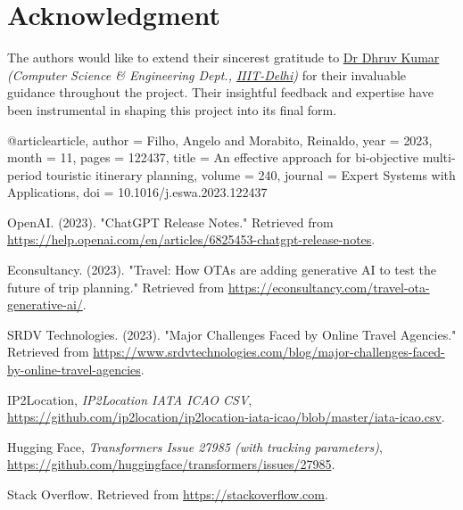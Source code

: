 \documentclass[conference]{IEEEtran}
\begin{document}
\section*{Acknowledgment}
    The authors would like to extend their sincerest gratitude to \href{https://www.iiitd.ac.in/dhruv}{Dr Dhruv Kumar} \textit{(Computer Science \& Engineering Dept., \href{https://www.iiitd.ac.in/}{IIIT-Delhi})} for their invaluable guidance throughout the project. Their insightful feedback and expertise have been instrumental in shaping this project into its final form.


\newpage

\begin{thebibliography}{1}

        @article{article,
        author = {Filho, Angelo and Morabito, Reinaldo},
        year = {2023},
        month = {11},
        pages = {122437},
        title = {An effective approach for bi-objective multi-period touristic itinerary planning},
        volume = {240},
        journal = {Expert Systems with Applications},
        doi = {10.1016/j.eswa.2023.122437}
        }

        OpenAI. (2023). "ChatGPT Release Notes." Retrieved from \url{https://help.openai.com/en/articles/6825453-chatgpt-release-notes}.

        Econsultancy. (2023). "Travel: How OTAs are adding generative AI to test the future of trip planning." Retrieved from \url{https://econsultancy.com/travel-ota-generative-ai/}.

        SRDV Technologies. (2023). "Major Challenges Faced by Online Travel Agencies." Retrieved from \url{https://www.srdvtechnologies.com/blog/major-challenges-faced-by-online-travel-agencies}.

        IP2Location, \emph{IP2Location IATA ICAO CSV}, \href{https://github.com/ip2location/ip2location-iata-icao/blob/master/iata-icao.csv}{https://github.com/ip2location/ip2location-iata-icao/blob/master/iata-icao.csv}.

        Hugging Face, \emph{Transformers Issue 27985 (with tracking parameters)}, \href{https://github.com/huggingface/transformers/issues/27985}{https://github.com/huggingface/transformers/issues/27985}.

        Stack Overflow. Retrieved from \url{https://stackoverflow.com}.


\end{thebibliography}
\end{document}
